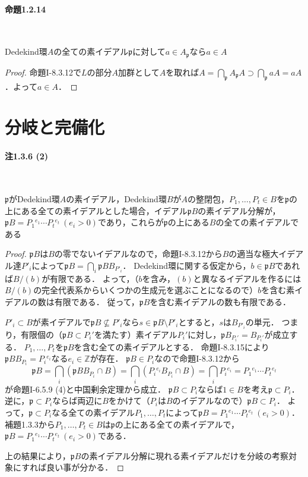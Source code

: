 \paragraph{命題1.2.14}~
\begin{screen}
  Dedekind環$A$の全ての素イデアル$\mathfrak{p}$に対して$a\in A_\mathfrak{p}$なら$a\in A$
\end{screen}
\begin{proof}
  命題I-8.3.12で$L$の部分$A$加群として$A$を取れば$A = \bigcap_\mathfrak{p}A_\mathfrak{p}A\supset\bigcap_\mathfrak{p}aA = aA$．よって$a\in A$．
\end{proof}

\section{分岐と完備化}
\paragraph{注1.3.6 (2)}~
\begin{screen}
  $\mathfrak{p}$がDedekind環$A$の素イデアル，Dedekind環$B$が$A$の整閉包，$P_1, \ldots, P_t\in B$を$\mathfrak{p}$の上にある全ての素イデアルとした場合，イデアル$\mathfrak{p}B$の素イデアル分解が，$\mathfrak{p}B = P_1{}^{e_1}\cdots P_t{}^{e_t}\ (e_i>0)$であり，これらが$\mathfrak{p}$の上にある$B$の全ての素イデアルである
\end{screen}
\begin{proof}
  $\mathfrak{p}B$は$B$の零でないイデアルなので，命題I-8.3.12から$B$の適当な極大イデアル達$P'_i$によって$\mathfrak{p}B = \bigcap_i\mathfrak{p}BB_{P'_i}$．
  Dedekind環に関する仮定から，$b\in\mathfrak{p}B$であれば$B/(b)$が有限である．
  よって，（$b$を含み，$(b)$と異なるイデアルを作るには$B/(b)$の完全代表系からいくつかの生成元を選ぶことになるので）$b$を含む素イデアルの数は有限である．
  従って，$\mathfrak{p}B$を含む素イデアルの数も有限である．

  $P'_i\subset B$が素イデアルで$\mathfrak{p}B\nsubseteq P'_i$なら$s\in\mathfrak{p}B\setminus P'_i$とすると，$s$は$B_{P'_i}$の単元．
  つまり，有限個の（$\mathfrak{p}B\subset P_i'$を満たす）素イデアル$P_i'$に対し，$\mathfrak{p}B_{P_i'} = B_{P_i'}$が成立する．
  $P_1, \ldots, P_t$を$\mathfrak{p}B$を含む全ての素イデアルとする．
  命題I-8.3.15により$\mathfrak{p}BB_{P_i} = P_i{}^{e_i}$なる$e_i\in\mathbb{Z}$が存在．
  $\mathfrak{p}B\in P_i$なので命題I-8.3.12から
  \[\mathfrak{p}B = \bigcap_i(\mathfrak{p}BB_{P_i}\cap B) = \bigcap_i(P_i{}^{e_i}B_{P_i}\cap B) = \bigcap_i P_i{}^{e_i} = P_1{}^{e_1}\cdots P_t{}^{e_t}\]
  が命題I-6.5.9 (4)と中国剰余定理から成立．
  $\mathfrak{p}B\subset P_i$ならば$1\in B$を考え$\mathfrak{p}\subset P_i$．
  逆に，$\mathfrak{p}\subset P_i$ならば両辺に$B$をかけて（$P_i$は$B$のイデアルなので）$\mathfrak{p}B\subset P_i$．
  よって，$\mathfrak{p}\subset P_i$なる全ての素イデアル$P_1, \ldots, P_t$によって$\mathfrak{p}B = P_1{}^{e_1}\cdots P_t{}^{e_t} ~ (e_i>0)$．
  補題1.3.3から$P_1, \ldots, P_t\in B$は$\mathfrak{p}$の上にある全ての素イデアルで，$\mathfrak{p}B = P_1{}^{e_1}\cdots P_t{}^{e_t}~ (e_i>0)$である．

  上の結果により，$\mathfrak{p}B$の素イデアル分解に現れる素イデアルだけを分岐の考察対象にすれば良い事が分かる．
\end{proof}

